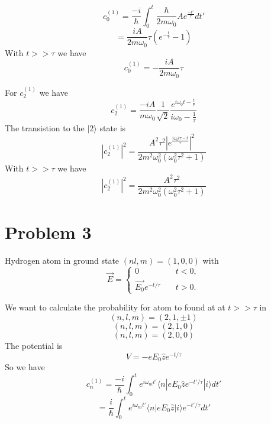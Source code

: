\documentclass[12pt]{article}
\newcommand{\ket}[1]{\vert{#1}\rangle}
\begin{document}
$$ c_0^{(1)} = \frac{-i}{\hbar} \int_0^t \frac{\hbar}{2 m \omega_0} A e^{\frac{-t'}{\tau} } dt' $$
$$ = \frac{iA}{2m \omega_0} \tau (e^{- \frac{t}{\tau}} -1 ) $$
With $t >> \tau $ we have 
$$ c_0^{(1)} = - \frac{i A}{2 m \omega_0 }\tau $$

For $c_2^{(1)} $ we have 
$$ c_2^{(1)} = \frac{-i A}{m \omega_0}\frac{1}{\sqrt{2}} \frac{e^{i \omega_0 t - \frac{t}{\tau}} }{i \omega_0 - \frac{1}{\tau} } $$
The transistion to the $\ket{2}$ state is 
$$ | c_2^{(1)} |^2 = \frac{A^2 \tau^2 | e^{\frac{i \omega_0 t \tau - t}{\tau}} |^2}{2 m^2 \omega_0^2 ( \omega_0^2 \tau^2 +1) } $$
With $t >> \tau $ we have 
$$ | c_2^{(1)} |^2 = \frac{A^2 \tau^2}{2 m^2 \omega_0^2 ( \omega_0^2 \tau^2 +1) } $$

\section*{Problem 3} 
Hydrogen atom in ground state $(n l, m) = (1,0,0)$ with 
$$ \vec{E} = \begin{cases}
    0 & \quad t <0, \\
    \vec{E_0} e^{-t/ \tau} & \quad t>0.
    \end{cases} $$

We want to calculate the probability for atom to found at at $t >> \tau $ in 
$$ (n,l,m) = (2,1, \pm 1) $$
$$ (n,l,m) = (2,1, 0) $$
$$ (n,l,m) = (2,0,0) $$
The potential is 
$$ V = -eE_0 \hat{z} e^{-t / \tau} $$ 
So we have 
$$ c_n^{(1)} = \frac{-i}{\hbar} \int_0^t e^{i \omega_{ni} t'} \langle n | e E_0 \hat{z} e^{-t' / \tau} | i \rangle dt' $$
$$ = \frac{i}{\hbar} \int_0^t e^{i \omega_{ni} t'} \langle n | e E_0 \hat{z} | i \rangle e^{-t' / \tau} dt' $$
\end{document}
